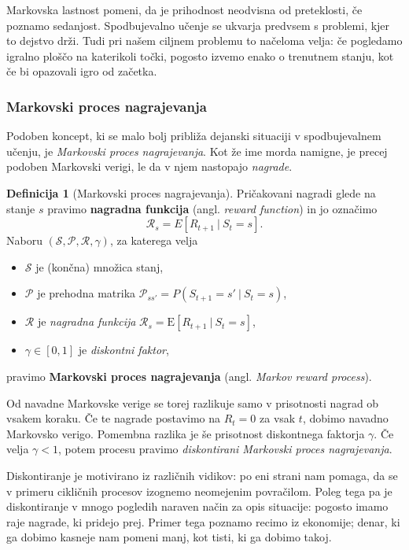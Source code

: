 \documentclass[12pt,a4paper]{amsart}
\theoremstyle{definition} %
\newtheorem{definicija}{Definicija}[section]
\theoremstyle{plain} %
\begin{document}
Markovska lastnost pomeni, da je prihodnost neodvisna od preteklosti, če poznamo sedanjost. 
Spodbujevalno učenje se ukvarja predvsem s problemi, kjer to dejstvo drži. Tudi pri našem 
ciljnem problemu to načeloma velja: če pogledamo igralno ploščo na katerikoli točki, pogosto 
izvemo enako o trenutnem stanju, kot če bi opazovali igro od začetka.

\subsubsection{Markovski proces nagrajevanja}
Podoben koncept, ki se malo bolj približa dejanski situaciji v spodbujevalnem učenju, je
\textit{Markovski proces nagrajevanja}. Kot že ime morda namigne, je precej podoben Markovski 
verigi, le da v njem nastopajo \textit{nagrade}. 

\begin{definicija}[Markovski proces nagrajevanja]
    Pričakovani nagradi glede na stanje $s$ pravimo \textbf{nagradna funkcija} (angl. \textit{reward 
    function}) in jo označimo
    $$
    \mathcal{R}_s = E[R_{t+1}~|~S_{t} = s].
    $$
    Naboru $(\mathcal{S}, \mathcal{P}, \mathcal{R}, \gamma)$, za katerega velja
    \begin{itemize}
        \item $\mathcal{S}$ je (končna) množica stanj,
        \item $\mathcal{P}$ je prehodna matrika $\mathcal{P}_{ss'} = P(S_{t+1} = s'~|~S_{t} = s)$, 
        \item $\mathcal{R}$ je \textit{nagradna funkcija} 
                $\mathcal{R}_s = \mathrm{E}[R_{t+1}~|~S_{t} = s]$, 
        \item $\gamma \in [0,1]$ je \textit{diskontni faktor}, 
    \end{itemize}
    pravimo \textbf{Markovski proces nagrajevanja} (angl. \textit{Markov reward process}).
\end{definicija}

Od navadne Markovske verige se torej razlikuje samo v prisotnosti nagrad ob vsakem koraku. Če te 
nagrade postavimo na $R_t = 0$ za vsak $t$, dobimo navadno Markovsko verigo. Pomembna razlika je še 
prisotnost diskontnega faktorja $\gamma$. Če velja $\gamma < 1$, potem procesu pravimo \textit{
diskontirani Markovski proces nagrajevanja}.

Diskontiranje je motivirano iz različnih vidikov: po eni strani nam pomaga, da se v primeru 
cikličnih procesov izognemo neomejenim povračilom. Poleg tega pa je diskontiranje v mnogo pogledih 
naraven način za opis situacije: pogosto imamo raje nagrade, ki pridejo prej. Primer tega poznamo 
recimo iz ekonomije; denar, ki ga dobimo kasneje nam pomeni manj, kot tisti, ki ga dobimo takoj. 
\end{document}
